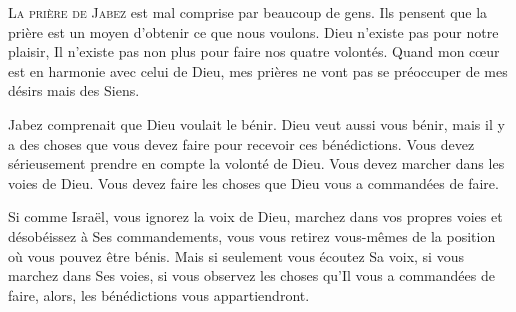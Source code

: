 \dvrule






\lettrine{L}{a prière de Jabez} est mal comprise par beaucoup de gens.
 Ils pensent que la prière est un moyen d'obtenir ce que nous voulons.
 Dieu n'existe pas pour notre plaisir, Il n'existe pas non plus pour faire
 nos quatre volontés.
 Quand mon c\oe{}ur est en harmonie avec celui de Dieu,
 mes prières ne vont pas se préoccuper de mes désirs mais des Siens. 


Jabez comprenait que Dieu voulait le bénir. Dieu veut aussi vous bénir,
 mais il y a des choses que vous devez faire pour recevoir ces bénédictions.
 Vous devez sérieusement prendre en compte la volonté de Dieu.
 Vous devez marcher dans les voies de Dieu.
 Vous devez faire les choses que Dieu vous a commandées de faire. 

Si comme Israël, vous ignorez la voix de Dieu, marchez dans vos propres voies
 et désobéissez à Ses commandements, vous vous retirez vous-mêmes
 de la position où vous pouvez être bénis. Mais si seulement
 vous écoutez Sa voix, si vous marchez dans Ses voies,
 si vous observez les choses qu'Il vous a commandées de faire, alors,
 les bénédictions vous appartiendront. 

\dvrule



